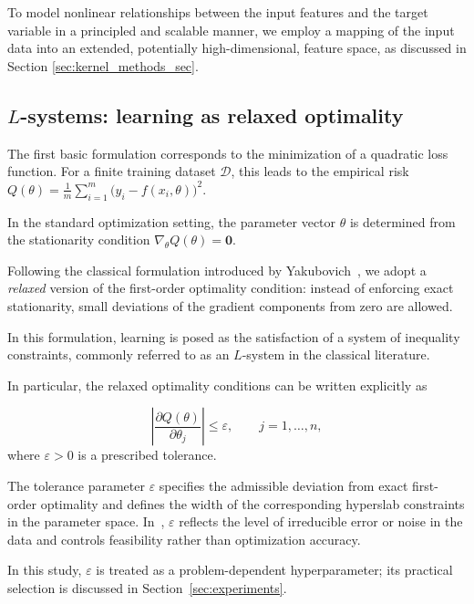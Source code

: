 \documentclass[a4paper,fleqn]{cas-sc}
\begin{document}
To model nonlinear relationships between the input features and the target variable in a principled and scalable manner, we employ a mapping of the input data into an extended, potentially high-dimensional, feature space, as discussed in Section \ref{sec:kernel_methods_sec}.

\subsection{$L$-systems: learning as relaxed optimality}

The first basic formulation corresponds to the minimization of a quadratic loss function.
For a finite training dataset $\mathcal{D}$, this leads to the empirical risk
$
Q(\theta)
=
\frac{1}{m}\sum_{i=1}^{m}
\bigl(y_i - f(x_i,\theta)\bigr)^2.
$

In the standard optimization setting, the parameter vector $\theta$
is determined from the stationarity condition
$\nabla_\theta Q(\theta)=\mathbf{0}$. 

Following the classical formulation introduced by Yakubovich~\cite{Yakubovich1966Recurrent},
we adopt a \emph{relaxed} version of the first-order optimality condition:
instead of enforcing exact stationarity,
small deviations of the gradient components from zero are allowed.

In this formulation, learning is posed as the satisfaction of a system of inequality constraints,
commonly referred to as an $L$-system in the classical literature.


In particular, the relaxed optimality conditions can be written explicitly as

\begin{equation}
\label{eq:L_relaxed_stationarity}
\left|
\frac{\partial Q(\theta)}{\partial \theta_j}
\right|
\le
\varepsilon,
\qquad
j = 1, \dots, n,
\end{equation}
where $\varepsilon > 0$ is a prescribed tolerance.


The tolerance parameter $\varepsilon$ specifies the admissible deviation from exact first-order optimality and defines the width of the corresponding hyperslab constraints in the parameter space.
In~\cite{Yakubovich1966Recurrent}, $\varepsilon$ reflects the level of irreducible error or noise in the data and controls feasibility rather than optimization accuracy.

In this study, $\varepsilon$ is treated as a problem-dependent hyperparameter; its practical selection is discussed in Section~\ref{sec:experiments}.
\end{document}
